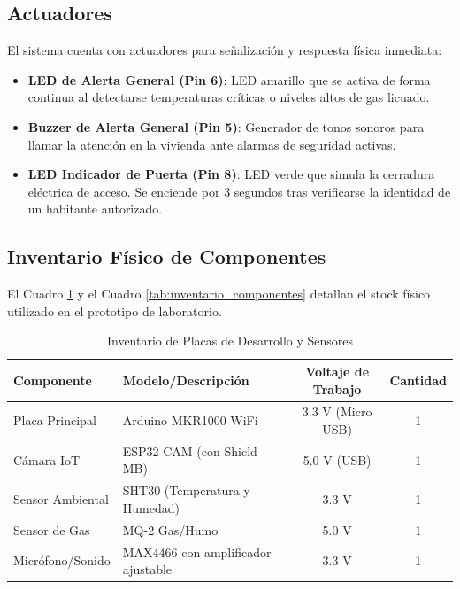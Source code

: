 \documentclass[12pt,letterpaper]{article}
\begin{document}
\subsection{Actuadores}
El sistema cuenta con actuadores para señalización y respuesta física inmediata:
\begin{itemize}
    \item \textbf{LED de Alerta General (Pin 6)}: LED amarillo que se activa de forma continua al detectarse temperaturas críticas o niveles altos de gas licuado.
    \item \textbf{Buzzer de Alerta General (Pin 5)}: Generador de tonos sonoros para llamar la atención en la vivienda ante alarmas de seguridad activas.
    \item \textbf{LED Indicador de Puerta (Pin 8)}: LED verde que simula la cerradura eléctrica de acceso. Se enciende por 3 segundos tras verificarse la identidad de un habitante autorizado.
\end{itemize}

\subsection{Inventario Físico de Componentes}
El Cuadro \ref{tab:inventario_placas} y el Cuadro \ref{tab:inventario_componentes} detallan el stock físico utilizado en el prototipo de laboratorio.

\begin{table}[H]
    \centering
    \caption{Inventario de Placas de Desarrollo y Sensores}
    \label{tab:inventario_placas}
    \begin{tabular}{llcc}
        \toprule
        \textbf{Componente} & \textbf{Modelo/Descripción} & \textbf{Voltaje de Trabajo} & \textbf{Cantidad} \\
        \midrule
        Placa Principal & Arduino MKR1000 WiFi & 3.3 V (Micro USB) & 1 \\
        Cámara IoT & ESP32-CAM (con Shield MB) & 5.0 V (USB) & 1 \\
        Sensor Ambiental & SHT30 (Temperatura y Humedad) & 3.3 V & 1 \\
        Sensor de Gas & MQ-2 Gas/Humo & 5.0 V & 1 \\
        Micrófono/Sonido & MAX4466 con amplificador ajustable & 3.3 V & 1 \\
        \bottomrule
    \end{tabular}
\end{table}
\end{document}
